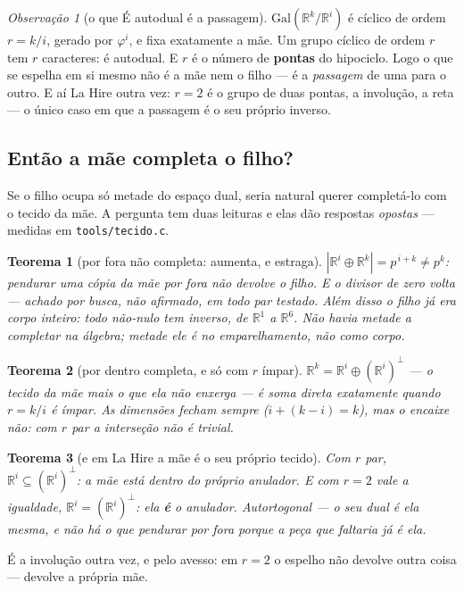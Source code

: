 \documentclass[11pt]{article}
\newcommand{\code}[1]{\texttt{\small #1}}
\newcommand{\R}{\mathbb R}
\theoremstyle{plain}
\newtheorem{teorema}{Teorema}
\theoremstyle{remark}
\newtheorem{obs}{Observação}
\begin{document}
\begin{obs}[o que É autodual é a passagem]
$\mathrm{Gal}(\R^k/\R^i)$ é cíclico de ordem $r=k/i$, gerado por $\varphi^i$, e fixa exatamente a mãe.
Um grupo cíclico de ordem $r$ tem $r$ caracteres: é autodual. E $r$ é o número de \textbf{pontas} do
hipociclo. Logo o que se espelha em si mesmo não é a mãe nem o filho --- é a \emph{passagem} de uma
para o outro. E aí La Hire outra vez: $r=2$ é o grupo de duas pontas, a involução, a reta --- o único
caso em que a passagem é o seu próprio inverso.
\end{obs}

\subsection*{Então a mãe completa o filho?}

Se o filho ocupa só metade do espaço dual, seria natural querer completá-lo com o tecido da mãe. A
pergunta tem duas leituras e elas dão respostas \emph{opostas} --- medidas em \code{tools/tecido.c}.

\begin{teorema}[por fora não completa: aumenta, e estraga]
$|\R^i\oplus\R^k|=p^{\,i+k}\ne p^k$: pendurar uma cópia da mãe por fora não devolve o filho. E o
divisor de zero volta --- \emph{achado por busca}, não afirmado, em todo par testado. Além disso o
filho já era corpo inteiro: todo não-nulo tem inverso, de $\R^1$ a $\R^6$. \emph{Não havia metade a
completar na álgebra}; metade ele é no emparelhamento, não como corpo.
\end{teorema}

\begin{teorema}[por dentro completa, e só com $r$ ímpar]
$\R^k=\R^i\oplus(\R^i)^{\perp}$ --- o tecido da mãe mais o que ela não enxerga --- é soma direta
\emph{exatamente} quando $r=k/i$ é ímpar. As dimensões fecham sempre ($i+(k-i)=k$), mas o encaixe
não: com $r$ par a interseção não é trivial.
\end{teorema}

\begin{teorema}[e em La Hire a mãe é o seu próprio tecido]
Com $r$ par, $\R^i\subseteq(\R^i)^{\perp}$: a mãe está dentro do próprio anulador. E com $r=2$ vale a
igualdade, $\R^i=(\R^i)^{\perp}$: ela \textbf{é} o anulador. Autortogonal --- o seu dual é ela mesma,
e não há o que pendurar por fora porque a peça que faltaria já é ela.
\end{teorema}

\noindent É a involução outra vez, e pelo avesso: em $r=2$ o espelho não devolve outra coisa ---
devolve a própria mãe.
\end{document}
